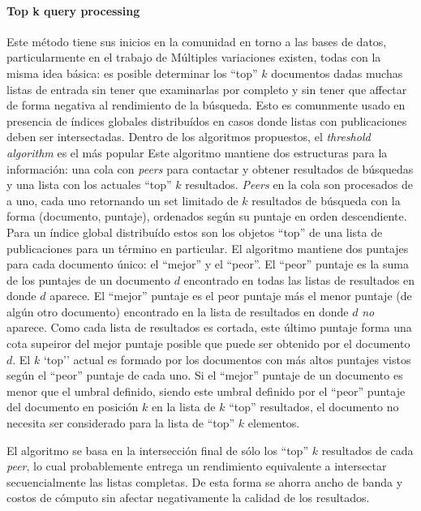 \paragraph{Top k query processing} %
Este método tiene sus inicios en la comunidad en torno a las bases de datos,
particularmente en el trabajo de %
Múltiples variaciones existen, todas con la misma idea básica: es posible
determinar los ``top'' $k$ documentos dadas muchas listas de entrada sin tener
que examinarlas por completo y sin tener que affectar de forma negativa al
rendimiento de la búsqueda. Esto es comunmente usado en presencia de índices
globales distribuídos en casos donde listas con publicaciones deben ser intersectadas.
Dentro de los algoritmos propuestos, el \textit{threshold algorithm} es el más
popular %
Este algoritmo mantiene dos estructuras para la información: una cola con
\textit{peers} para contactar y obtener resultados de búsquedas y una lista con
los actuales ``top'' $k$ resultados. \textit{Peers} en la cola son procesados
de a uno, cada uno retornando un set limitado de $k$ resultados de búsqueda con
la forma (documento, puntaje), ordenados según su puntaje en orden descendiente.
Para un índice global distribuído estos son los objetos ``top'' de una lista de
publicaciones para un término en particular. El algoritmo mantiene dos puntajes
para cada documento único: el ``mejor'' y el ``peor''. El ``peor'' puntaje es la suma de
los puntajes de un documento $d$ encontrado en todas las listas de resultados en
donde $d$ aparece. El ``mejor'' puntaje es el peor puntaje más el menor puntaje
(de algún otro documento) encontrado en la lista de resultados en donde $d$
\textit{no} aparece. Como cada lista de resultados es cortada, este último
puntaje forma una cota supeiror del mejor puntaje posible que puede ser obtenido
por el documento $d$. El $k$ `top'' actual  es formado por los documentos con más altos
puntajes vistos según el ``peor'' puntaje de cada uno. Si el ``mejor'' puntaje
de un documento es menor que el umbral definido, siendo este umbral definido por el ``peor'' puntaje del
documento en posición $k$ en la lista de $k$ ``top'' resultados, el documento no
necesita ser considerado para la lista de ``top'' $k$ elementos.

El algoritmo se basa en la intersección final de sólo los ``top'' $k$ resultados
de cada \textit{peer}, lo cual probablemente entrega un rendimiento equivalente
a intersectar secuencialmente las listas completas. De esta forma se ahorra
ancho de banda y costos de cómputo sin afectar negativamente la calidad de los
resultados.

